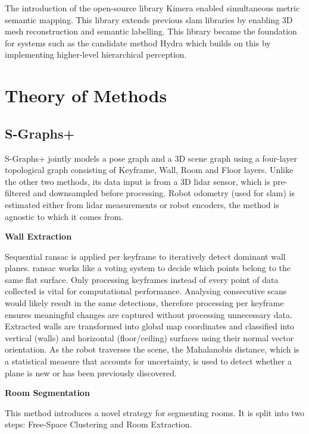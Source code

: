 The introduction of the open-source library Kimera \cite{DBLP:journals/corr/abs-1910-02490} enabled simultaneous metric semantic mapping. This library extends previous \gls{slam} libraries by enabling 3D mesh reconstruction and semantic labelling. This library became the foundation for systems such as the candidate method Hydra \cite{hydra} which builds on this by implementing higher-level hierarchical perception.


\section{Theory of Methods}\label{sec:theory}

\subsection{S-Graphs+\cite{s_graphs_plus}}\label{subsec:s-graph}
S-Graphs+ jointly models a pose graph and a 3D scene graph using a four-layer topological graph consisting of Keyframe, Wall, Room and Floor layers. Unlike the other two methods, its data input is from a 3D \acrshort{lidar} sensor, which is pre-filtered and downsampled before processing. Robot odometry (used for \gls{slam}) is estimated either from \acrshort{lidar} measurements or robot encoders, the method is agnostic to which it comes from.

\noindent \textbf{Wall Extraction}

Sequential \gls{ransac} is applied per keyframe to iteratively detect dominant wall planes. \gls{ransac} works like a voting system to decide which points belong to the same flat surface. Only processing keyframes instead of every point of data collected is vital for computational performance. Analysing consecutive scans would likely result in the same detections, therefore processing per keyframe ensures meaningful changes are captured without processing unnecessary data.
Extracted walls are transformed into global map coordinates and classified into vertical (walls) and horizontal (floor/ceiling) surfaces using their normal vector orientation. As the robot traverses the scene, the Mahalanobis distance, which is a statistical measure that accounts for uncertainty, is used to detect whether a plane is new or has been previously discovered.

\noindent \textbf{Room Segmentation}

This method introduces a novel strategy for segmenting rooms. It is split into two steps: Free-Space Clustering and Room Extraction.

